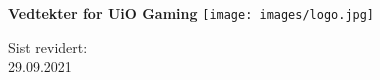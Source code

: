 \begin{titlepage}
\begin{center}
    \vspace*{1cm}

    \Huge
    \textbf{Vedtekter for UiO Gaming}
    \vspace{1cm}
    \vspace{3cm}
    \texttt{[image: images/logo.jpg]}
    \vspace{7cm}

    \LARGE
    Sist revidert:\\
    29.09.2021
\end{center}
\end{titlepage}